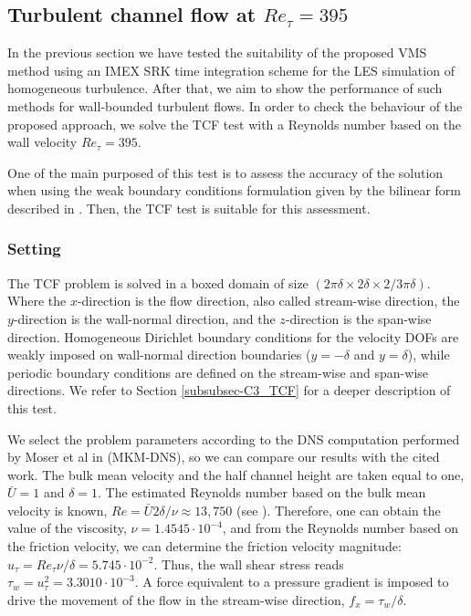 \subsection{Turbulent channel flow at $Re_\tau=395$}
\label{subsec-C7_TCF}
In the previous section we have tested the suitability of the proposed VMS method using an IMEX SRK time integration scheme for the LES simulation of homogeneous turbulence. After that, we aim to show the performance of such methods for wall-bounded turbulent flows. In order to check the behaviour of the proposed approach, we solve the TCF test with a Reynolds number based on the wall velocity $ Re_\tau=395 $.

One of the main purposed of this test is to assess the accuracy of the solution when using the weak boundary conditions formulation given by the bilinear form described in . Then, the TCF test is suitable for this assessment.

\subsubsection{Setting}
The TCF problem is solved in a boxed domain of size $(2\pi\delta\times 2\delta\times 2/3\pi\delta)$. Where the $x$-direction is the flow direction, also called stream-wise direction, the $y$-direction is the wall-normal direction, and the $z$-direction is the span-wise direction. Homogeneous Dirichlet boundary conditions for the velocity DOFs are weakly imposed on wall-normal direction boundaries ($y=-\delta$ and $y=\delta$), while periodic boundary conditions are defined on the stream-wise and span-wise directions. We refer to Section \ref{subsubsec-C3_TCF} for a deeper description of this test.

We select the problem parameters according to the DNS computation performed by Moser et al in \cite{moser_direct_1999,kim_turbulence_1987} (MKM-DNS), so we can compare our results with the cited work. The bulk mean velocity and the half channel height are taken equal to one, $\bar{U}=1$ and $\delta=1$. The estimated Reynolds number based on the bulk mean velocity is known, $Re=\bar{U}2\delta/\nu\approx 13,750$ (see \cite{pope_turbulent_2000}). Therefore, one can obtain the value of the viscosity, $\nu=1.4545\cdot10^{-4}$, and from the Reynolds number based on the friction velocity, we can determine the friction velocity magnitude: $u_\tau=Re_\tau\nu/\delta=5.745\cdot10^{-2}$. Thus, the wall shear stress reads $\tau_w=u_\tau^2=3.3010\cdot10^{-3}$. A force equivalent to a pressure gradient is imposed to drive the movement of the flow in the stream-wise direction, $f_x=\tau_w/\delta$.

